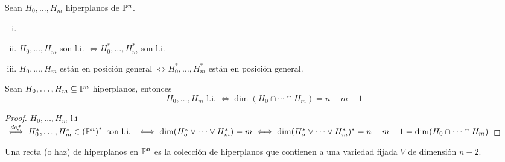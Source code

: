 \begin{defi}
    Sean $H_0, \dots, H_m$ hiperplanos de $\mathbb{P}^n$.
    \begin{enumerate}[(i)]
        \item[]
        \item $H_0, \dots, H_m$ son l.i. $\iff H_0^*, \dots, H_m^*$ son l.i.
        \item $H_0, \dots, H_m$ están en posición general $\iff H_0^*, \dots, H_m^*$ están en posición general.
    \end{enumerate}
\end{defi}

\begin{prop}
    Sean $H_0,\dots,H_m \subseteq \mathbb{P}^n$ hiperplanos, entonces
    \[
        H_0,\dots, H_m \text{ l.i. } \iff \dim(H_0 \cap \cdots \cap H_m) = n - m - 1
    \]
\end{prop}
\begin{proof}
    $H_0,\dots,H_m$ l.i $\stackrel{def}{\iff} H_0^*,\dots,H_m^* \in \left(\mathbb{P}^n\right)^* \text{ son l.i. }
    \iff \dim(H_o^* \vee \cdots \vee H_m^*) = m \iff \dim(H_o^* \vee \cdots \vee H_m^*)^* = n - m-1
    = \dim(H_0 \cap \cdots \cap H_m)$
\end{proof}

\begin{defi}
    Una recta (o haz) de hiperplanos en $\mathbb{P}^n$ es la colección de hiperplanos que contienen a una variedad
    fijada $V$ de dimensión $n-2$.
\end{defi}


